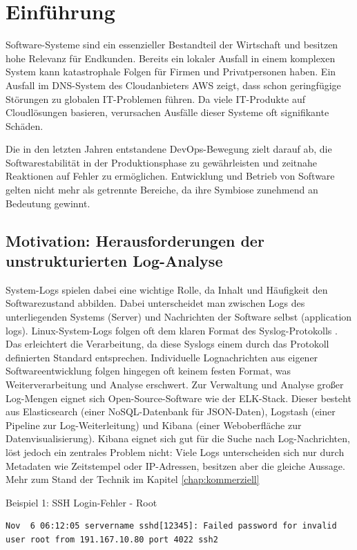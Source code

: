 \chapter{Einführung}
\label{chap:einf}
Software-Systeme sind ein essenzieller Bestandteil der Wirtschaft und besitzen hohe Relevanz für Endkunden. Bereits ein lokaler Ausfall in einem komplexen System kann katastrophale Folgen für Firmen und Privatpersonen haben. Ein Ausfall im \ac{DNS}-System des Cloudanbieters \ac{AWS} \cite{Staff_2025} zeigt, dass schon geringfügige Störungen zu globalen \ac{IT}-Problemen führen. Da viele IT-Produkte auf Cloudlösungen basieren, verursachen Ausfälle dieser Systeme oft signifikante Schäden.

Die in den letzten Jahren entstandene DevOps-Bewegung \cite{bass2015devops} zielt darauf ab, die Softwarestabilität in der Produktionsphase zu gewährleisten und zeitnahe Reaktionen auf Fehler zu ermöglichen. Entwicklung und Betrieb von Software gelten nicht mehr als getrennte Bereiche, da ihre Symbiose zunehmend an Bedeutung gewinnt.



\section{Motivation: Herausforderungen der unstrukturierten Log-Analyse}
System-Logs spielen dabei eine wichtige Rolle, da Inhalt und Häufigkeit den Softwarezustand abbilden. Dabei unterscheidet man zwischen Logs des unterliegenden Systems (Server) und Nachrichten der Software selbst (application logs). Linux-System-Logs folgen oft dem klaren Format des Syslog-Protokolls \cite{rfc5424}. Das erleichtert die Verarbeitung, da diese Syslogs einem durch das Protokoll definierten Standard entsprechen.
Individuelle Lognachrichten aus eigener Softwareentwicklung folgen hingegen oft keinem festen Format, was Weiterverarbeitung und Analyse erschwert. Zur Verwaltung und Analyse großer Log-Mengen eignet sich Open-Source-Software wie der \ac{ELK}-Stack. Dieser besteht aus Elasticsearch (einer NoSQL-Datenbank für \ac{JSON}-Daten), Logstash (einer Pipeline zur Log-Weiterleitung) und Kibana (einer Weboberfläche zur Datenvisualisierung).
Kibana eignet sich gut für die Suche nach Log-Nachrichten, löst jedoch ein zentrales Problem nicht: Viele Logs unterscheiden sich nur durch Metadaten wie Zeitstempel oder \ac{IP}-Adressen, besitzen aber die gleiche Aussage. Mehr zum Stand der Technik im Kapitel \ref{chap:kommerziell}

\begin{logbox}{Beispiel 1: \ac{SSH} Login-Fehler - Root}
\begin{lstlisting}
Nov  6 06:12:05 servername sshd[12345]: Failed password for invalid user root from 191.167.10.80 port 4022 ssh2
\end{lstlisting}
\end{logbox}

